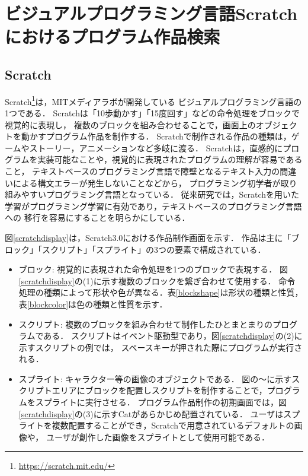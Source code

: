 \documentclass[11pt]{jreport}
\begin{document}
\chapter{ビジュアルプログラミング言語Scratchにおけるプログラム作品検索}

\section{Scratch}
Scratch\footnote{ \url{https://scratch.mit.edu/}}は，MITメディアラボが開発している
ビジュアルプログラミング言語の1つである．
Scratchは「10歩動かす」「15度回す」などの命令処理をブロックで視覚的に表現し，
複数のブロックを組み合わせることで，画面上のオブジェクトを動かすプログラム作品を制作する．
Scratchで制作される作品の種類は，ゲームやストーリー，アニメーションなど多岐に渡る\cite{wild}．
Scratchは，直感的にプログラムを実装可能なことや，視覚的に表現されたプログラムの理解が容易であること，
テキストベースのプログラミング言語で障壁となるテキスト入力の間違いによる構文エラーが発生しないことなどから，
プログラミング初学者が取り組みやすいプログラミング言語となっている．
従来研究では，Scratchを用いた学習がプログラミング学習に有効であり，テキストベースのプログラミング言語への
移行を容易にすることを明らかにしている\cite{blocktotext}\cite{blockandbeyond}．

図\ref{scratchdisplay}は，Scratch3.0における作品制作画面を示す．
作品は主に「ブロック」「スクリプト」「スプライト」の3つの要素で構成されている．

\begin{itemize}
    \item ブロック: 視覚的に表現された命令処理を1つのブロックで表現する．
    図\ref{scratchdisplay}の(1)に示す複数のブロックを繋ぎ合わせて使用する．
    命令処理の種類によって形状や色が異なる．表\ref{blockshape}は形状の種類と性質，
    表\ref{blockcolor}は色の種類と性質を示す．
    \item スクリプト: 複数のブロックを組み合わせて制作したひとまとまりのプログラムである．
    スクリプトはイベント駆動型であり，図\ref{scratchdisplay}の(2)に示すスクリプトの例では，
    スペースキーが押された際にプログラムが実行される．
    \item スプライト: キャラクター等の画像のオブジェクトである．
    図の〜に示すスクリプトエリアにブロックを配置しスクリプトを制作することで，プログラムをスプライトに実行させる．
    プログラム作品制作の初期画面では，図\ref{scratchdisplay}の(3)に示すCatがあらかじめ配置されている．
    ユーザはスプライトを複数配置することができ，Scratchで用意されているデフォルトの画像や，
    ユーザが創作した画像をスプライトとして使用可能である．
\end{itemize}
\end{document}
